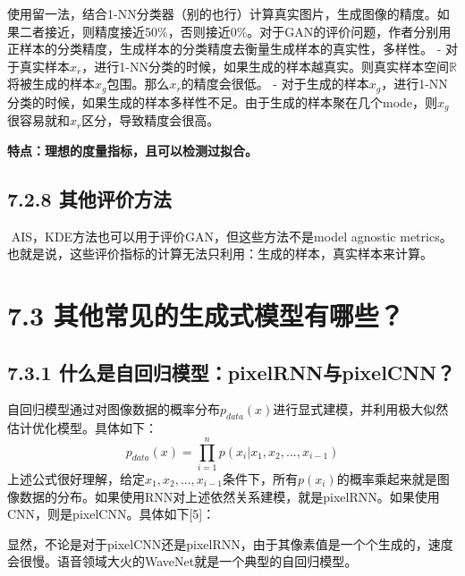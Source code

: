 ​
使用留一法，结合1-NN分类器（别的也行）计算真实图片，生成图像的精度。如果二者接近，则精度接近50\%，否则接近0\%。对于GAN的评价问题，作者分别用正样本的分类精度，生成样本的分类精度去衡量生成样本的真实性，多样性。
-
对于真实样本\(x_r\)，进行1-NN分类的时候，如果生成的样本越真实。则真实样本空间\(\mathbb R\)将被生成的样本\(x_g\)包围。那么\(x_r\)的精度会很低。
-
对于生成的样本\(x_g​\)，进行1-NN分类的时候，如果生成的样本多样性不足。由于生成的样本聚在几个mode，则\(x_g​\)很容易就和\(x_r​\)区分，导致精度会很高。

\textbf{特点：理想的度量指标，且可以检测过拟合。}

\subsection{7.2.8
其他评价方法}\label{ux5176ux4ed6ux8bc4ux4ef7ux65b9ux6cd5}

​ AIS，KDE方法也可以用于评价GAN，但这些方法不是model agnostic
metrics。也就是说，这些评价指标的计算无法只利用：生成的样本，真实样本来计算。

\section{7.3
其他常见的生成式模型有哪些？}\label{ux5176ux4ed6ux5e38ux89c1ux7684ux751fux6210ux5f0fux6a21ux578bux6709ux54eaux4e9b}

\subsection{7.3.1
什么是自回归模型：pixelRNN与pixelCNN？}\label{ux4ec0ux4e48ux662fux81eaux56deux5f52ux6a21ux578bpixelrnnux4e0epixelcnn}

​
自回归模型通过对图像数据的概率分布\(p_{data}(x)\)进行显式建模，并利用极大似然估计优化模型。具体如下：
\[
p_{data}(x)=\prod_{i=1}^np(x_i|x_1,x_2,...,x_{i-1})
\] ​
上述公式很好理解，给定\(x_1,x_2,...,x_{i-1}\)条件下，所有\(p(x_i)\)的概率乘起来就是图像数据的分布。如果使用RNN对上述依然关系建模，就是pixelRNN。如果使用CNN，则是pixelCNN。具体如下{[}5{]}：

\caption{}

\caption{}

​
显然，不论是对于pixelCNN还是pixelRNN，由于其像素值是一个个生成的，速度会很慢。语音领域大火的WaveNet就是一个典型的自回归模型。

